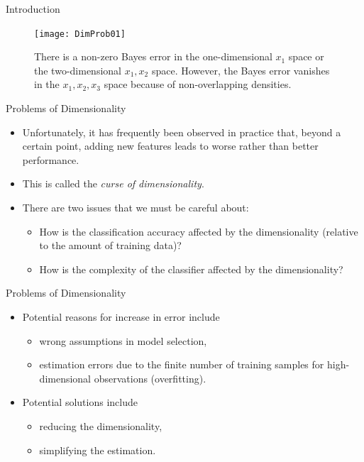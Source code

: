 \begin{frame}{Introduction}
\begin{figure}
\texttt{[image: DimProb01]}
\caption{There is a non-zero Bayes error in the one-dimensional $x_1$ space or the two-dimensional $x_1,x_2$ space. However, the Bayes error vanishes in the $x_1,x_2,x_3$ space because of non-overlapping densities.} 
\end{figure}
\end{frame}

\begin{frame}{Problems of Dimensionality}
\begin{itemize}
\setlength{\itemsep}{12pt}
\item Unfortunately, it has frequently been observed in practice
that, beyond a certain point, adding new features leads to
worse rather than better performance.
\item This is called the \textit{\color{mycolor2}curse of dimensionality}.
\item There are two issues that we must be careful about:
\begin{itemize}
\item How is the {\color{mycolor1}classification accuracy} affected by the dimensionality (relative to the amount of training data)?
\item How is the {\color{mycolor1}complexity of the classifier} affected by the
dimensionality?
\end{itemize}
\end{itemize}
\end{frame}

\begin{frame}{Problems of Dimensionality}
\begin{itemize}
\setlength{\itemsep}{12pt}
\item Potential reasons for increase in error include
\begin{itemize}
\item wrong assumptions in model selection,
\item estimation errors due to the finite number of training samples for high-dimensional observations (overfitting).
\end{itemize}
\item Potential solutions include
\begin{itemize}
\item reducing the dimensionality,
\item simplifying the estimation.
\end{itemize}
\end{itemize}
\end{frame}

